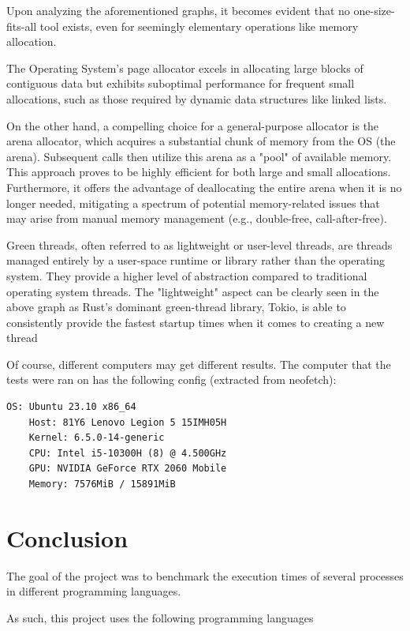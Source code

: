 \documentclass{article}
\begin{document}
Upon analyzing the aforementioned graphs, it becomes evident that no one-size-fits-all tool exists, even for seemingly elementary operations like memory allocation.

The Operating System's page allocator excels in allocating large blocks of contiguous data but exhibits suboptimal performance for frequent small allocations, such as those required by dynamic data structures like linked lists.

On the other hand, a compelling choice for a general-purpose allocator is the arena allocator, which acquires a substantial chunk of memory from the OS (the arena). Subsequent calls then utilize this arena as a "pool" of available memory. This approach proves to be highly efficient for both large and small allocations. Furthermore, it offers the advantage of deallocating the entire arena when it is no longer needed, mitigating a spectrum of potential memory-related issues that may arise from manual memory management (e.g., double-free, call-after-free).

Green threads, often referred to as lightweight or user-level threads, are threads managed entirely by a user-space runtime or library rather than the operating system. They provide a higher level of abstraction compared to traditional operating system threads.
The "lightweight" aspect can be clearly seen in the above graph as Rust's dominant green-thread library, Tokio, is able to consistently provide the fastest startup times when it comes to creating a new thread

Of course, different computers may get different results. The computer that the tests were ran on has the following config (extracted from neofetch):

\begin{lstlisting}[]
    OS: Ubuntu 23.10 x86_64 
    Host: 81Y6 Lenovo Legion 5 15IMH05H 
    Kernel: 6.5.0-14-generic 
    CPU: Intel i5-10300H (8) @ 4.500GHz 
    GPU: NVIDIA GeForce RTX 2060 Mobile 
    Memory: 7576MiB / 15891MiB 
\end{lstlisting}

\clearpage
\section{Conclusion}

The goal of the project was to benchmark the execution times of several processes in different programming languages. 

As such, this project uses the following programming languages
\end{document}
